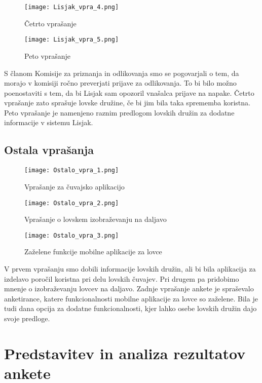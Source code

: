 \documentclass[a4paper,12pt,openright]{book}
\begin{document}
\begin{figure}[ht]
    \centering
    \texttt{[image: Lisjak\_vpra\_4.png]}
    \caption{Četrto vprašanje}
\end{figure}

\begin{figure}[ht]
    \centering
    \texttt{[image: Lisjak\_vpra\_5.png]}
    \caption{Peto vprašanje}
\end{figure}


S članom Komisije za priznanja in odlikovanja smo se pogovarjali o tem, da morajo v komisiji ročno preverjati prijave za odlikovanja.
To bi bilo možno poenostaviti s tem, da bi Lisjak sam opozoril vnašalca prijave na napake.
Četrto vprašanje zato sprašuje lovske družine, če bi jim bila taka sprememba koristna.
Peto vprašanje je namenjeno raznim predlogom lovskih družin za dodatne informacije v sistemu Lisjak.

\newpage
\subsection{Ostala vprašanja}

\begin{figure}[H]
    \centering
    \texttt{[image: Ostalo\_vpra\_1.png]}
    \caption{Vprašanje za čuvajsko aplikacijo}
\end{figure}


\begin{figure}[H]
    \centering
    \texttt{[image: Ostalo\_vpra\_2.png]}
    \caption{Vprašanje o lovskem izobraževanju na daljavo}
\end{figure}

\begin{figure}[H]
    \centering
    \texttt{[image: Ostalo\_vpra\_3.png]}
    \caption{Zaželene funkcije mobilne aplikacije za lovce}
\end{figure}

V prvem vprašanju smo dobili informacije lovskih družin, ali bi bila aplikacija za izdelavo poročil koristna pri delu lovskih čuvajev.
Pri drugem pa pridobimo mnenje o izobraževanju lovcev na daljavo.
Zadnje vprašanje ankete je spraševalo anketirance, katere funkcionalnosti mobilne aplikacije za lovce so zaželene.
Bila je tudi dana opcija za dodatne funkcionalnosti, kjer lahko osebe lovskih družin dajo svoje predloge.

\newpage

\section{Predstavitev in analiza rezultatov ankete}
\end{document}
